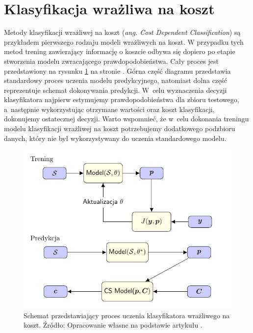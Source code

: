 \documentclass[inzynierska]{pwr_wmat_praca_dyplomowa}
\theoremstyle{plain}
\numberwithin{theorem}{chapter}
\theoremstyle{definition}
\numberwithin{theorem}{chapter}
\begin{document}
\section{Klasyfikacja wrażliwa na koszt}
Metody klasyfikacji wrażliwej na koszt (\textit{ang. Cost Dependent Classification})  są przykładem pierwszego rodzaju modeli wrażliwych na koszt. W przypadku tych metod trening zawierający informację o koszcie odbywa się dopiero po etapie stworzenia modelu zwracającego prawdopodobieństwa. Cały proces jest przedstawiony na rysunku \ref{cdc} na stronie \pageref{cdc}. Górna część diagramu przedstawia standardowy proces uczenia modelu predykcyjnego, natomiast dolna część reprezentuje schemat dokonywania predykcji. W~celu wyznaczenia decyzji klasyfikatora najpierw estymujemy prawdopodobieństwa dla zbioru testowego, a~następnie wykorzystując otrzymane wartości oraz koszt klasyfikacji, dokonujemy ostatecznej decyzji. Warto wspomnieć, że w~celu dokonania treningu modelu klasyfikacji wrażliwej na koszt potrzebujemy dodatkowego podzbioru danych, który nie był wykorzystywany do uczenia standardowego modelu.
\begin{figure}[h]
	\includegraphics[width=\linewidth]{plots/cost_sensitive_classification.pdf}
	\caption{Schemat przedstawiający proces uczenia klasyfikatora wrażliwego na koszt. Źródło: Opracowanie własne na podstawie artykułu \cite{RMoser}.}
	\label{cdc}
\end{figure}
\end{document}
